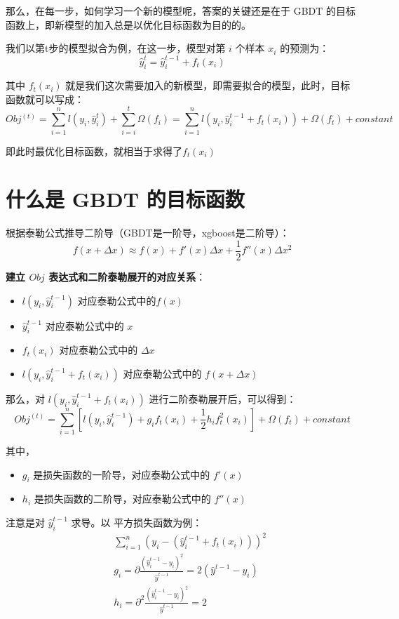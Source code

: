 \documentclass[12pt]{article}
\begin{document}
那么，在每一步，如何学习一个新的模型呢，答案的关键还是在于 GBDT 的目标函数上，即新模型的加入总是以优化目标函数为目的的。

我们以第t步的模型拟合为例，在这一步，模型对第 $i$ 个样本 $x_i$ 的预测为：
$$
\hat{y}_i^t = \hat{y}_i^{t-1} + f_t(x_i)
$$

其中 $f_t(x_i)$ 就是我们这次需要加入的新模型，即需要拟合的模型，此时，目标函数就可以写成：
$$
Obj^{(t)} = \sum_{i=1}^n{l(y_i,\hat{y}_i^t)} + \sum_{i=i}^{t}\Omega(f_i) = \sum_{i=1}^n{l(y_i,\hat{y}_i^{t-1} + f_t(x_i))} + \Omega(f_t) + constant
$$

即此时最优化目标函数，就相当于求得了$f_t(x_i)$

\section{什么是 GBDT 的目标函数}
根据泰勒公式推导二阶导（GBDT是一阶导，xgboost是二阶导）：
$$
f(x+\Delta x) \approx f(x) + f'(x)\Delta x + \frac{1}{2}f''(x)\Delta x^2
$$

\textbf{建立 $Obj$ 表达式和二阶泰勒展开的对应关系}：

\begin{itemize}[itemindent=2em]
    \item $l(y_i,\hat{y}_i^{t-1})$ 对应泰勒公式中的$f(x)$
    
    \item $\hat{y}_i^{t-1}$ 对应泰勒公式中的 $x$
    
    \item $f_t(x_i)$ 对应泰勒公式中的 $\Delta x$
    
    \item $l(y_i,\hat{y}_i^{t-1} + f_t(x_i))$ 对应泰勒公式中的 $f(x+\Delta x)$
\end{itemize}

那么，对 $l(y_i,\hat{y}_i^{t-1} + f_t(x_i))$ 进行二阶泰勒展开后，可以得到：
$$
Obj^{(t)} = \sum_{i=1}^n[l(y_i,\hat{y}_i^{t-1}) + g_if_t(x_i) + \frac{1}{2}h_if_t^2(x_i)] + \Omega (f_t) + constant
$$

其中，
\begin{itemize}[itemindent=2em]
    \item $g_i$ 是损失函数的一阶导，对应泰勒公式中的 $f'(x)$
    
    \item $h_i$ 是损失函数的二阶导，对应泰勒公式中的 $f''(x)$
\end{itemize}

注意是对 $\hat{y}_i^{t-1}$ 求导。以 平方损失函数为例：
\begin{eqnarray*}
    && \sum_{i=1}^n(y_i - (\hat{y}_i^{t-1}+f_t(x_i)))^2 \\
    && g_i = \partial{\frac{(\hat{y}_i^{t-1} - y_i)^2}{\hat{y}^{t-1}}} = 2(\hat{y}^{t-1} - y_i) \\
    && h_i = \partial ^2{\frac{(\hat{y}_i^{t-1} - y_i)^2}{\hat{y}^{t-1}}} = 2
\end{eqnarray*}
\end{document}
